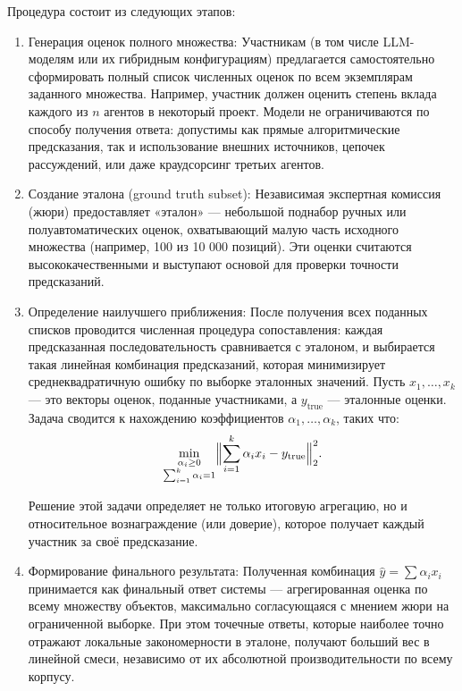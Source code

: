 \documentclass[
    14pt,
    specialist,
    candidate, %
    subf, %
    href,
    dotsinheaders=false
]{disser}
\begin{document}
Процедура состоит из следующих этапов:

\begin{enumerate}
  \item Генерация оценок полного множества:
        Участникам (в том числе LLM-моделям или их гибридным конфигурациям) предлагается самостоятельно сформировать полный список численных оценок по всем экземплярам заданного множества. Например, участник должен оценить степень вклада каждого из $n$ агентов в некоторый проект. Модели не ограничиваются по способу получения ответа: допустимы как прямые алгоритмические предсказания, так и использование внешних источников, цепочек рассуждений, или даже краудсорсинг третьих агентов.

  \item Создание эталона (ground truth subset):
        Независимая экспертная комиссия (жюри) предоставляет «эталон» — небольшой поднабор ручных или полуавтоматических оценок, охватывающий малую часть исходного множества (например, 100 из 10 000 позиций). Эти оценки считаются высококачественными и выступают основой для проверки точности предсказаний.

  \item Определение наилучшего приближения:
        После получения всех поданных списков проводится численная процедура сопоставления: каждая предсказанная последовательность сравнивается с эталоном, и выбирается такая линейная комбинация предсказаний, которая минимизирует среднеквадратичную ошибку по выборке эталонных значений. Пусть $x_1, \dots, x_k$ — это векторы оценок, поданные участниками, а $y_{\text{true}}$ — эталонные оценки. Задача сводится к нахождению коэффициентов $\alpha_1, \dots, \alpha_k$, таких что:
        \[
          \min_{\substack{\alpha_i \ge 0 \\ \sum_{i=1}^k \alpha_i = 1}}
          \Bigl\lVert \sum_{i=1}^k \alpha_i x_i - y_{\text{true}} \Bigr\rVert_2^2.
        \]

        Решение этой задачи определяет не только итоговую агрегацию, но и относительное вознаграждение (или доверие), которое получает каждый участник за своё предсказание.

  \item Формирование финального результата:
        Полученная комбинация $\hat{y} = \sum \alpha_i x_i$ принимается как финальный ответ системы — агрегированная оценка по всему множеству объектов, максимально согласующаяся с мнением жюри на ограниченной выборке. При этом точечные ответы, которые наиболее точно отражают локальные закономерности в эталоне, получают больший вес в линейной смеси, независимо от их абсолютной производительности по всему корпусу.
\end{enumerate}
\end{document}
